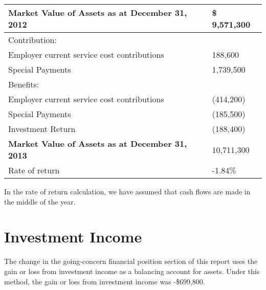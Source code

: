 \documentclass{report}
\begin{document}
\vspace{3mm}
\bgroup
\normalsize
\def\arraystretch{1.5}
\begin{tabular}{p{8.5cm} p{4.5cm}}
\hline
\textbf{Market Value of Assets as at December 31, 2012 }&  \hspace{5mm} \$ \hspace{5mm} 9,571,300 \\ \hline 
Contribution: \\ 
 \hspace{3mm} Employer current service cost contributions & \hspace{14mm} 188,600 \\ 
\vspace{-5mm} \hspace{3mm} Special Payments & \vspace{-5mm}  \hspace{14mm} 1,739,500 \\  
Benefits: \\ 
 \hspace{3mm} Employer current service cost contributions & \hspace{14mm} (414,200) \\ 
\vspace{-5mm}  \hspace{3mm} Special Payments & \vspace{-5mm} \hspace{14mm} (185,500) \\  
Investment Return & \hspace{14mm} (188,400) \\ \hline
\textbf{Market Value of Assets as at December 31, 2013} & \hspace{14mm} 10,711,300 \\ \hline
Rate of return & \hspace{14mm} -1.84\% \\ \hline
\end{tabular}
\egroup

\vspace{3mm}
In the rate of return calculation, we have assumed that cash flows are made in the middle of the year.

\section{Investment Income}

The change in the going-concern financial position section of this report uses the gain or loss from investment income as a balancing account for assets. Under this method, the gain or loss from investment income was -\$699,800. 
\end{document}
